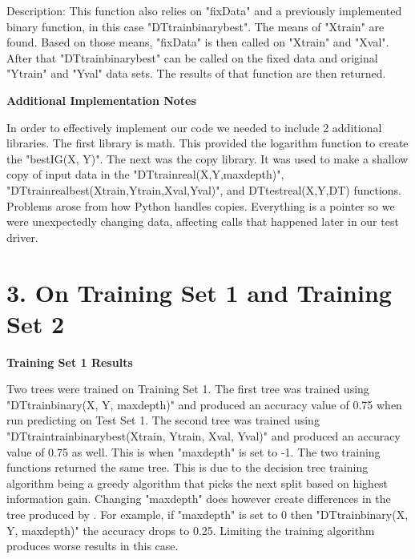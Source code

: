 \documentclass{article}
\begin{document}
\indent Description: This function also relies on "fixData" and a previously implemented binary function, in this case "DT\textunderscore train\textunderscore binary\textunderscore best". The means of "X\textunderscore train" are found. Based on those means, "fixData" is then called on "X\textunderscore train" and "X\textunderscore val". After that "DT\textunderscore train\textunderscore binary\textunderscore best" can be called on the fixed data and original "Y\textunderscore train" and "Y\textunderscore val" data sets. The results of that function are then returned.

\textbf{Additional Implementation Notes}

\indent In order to effectively implement our code we needed to include 2 additional libraries. The first library is math. This provided the logarithm function to create the "best\textunderscore IG(X, Y)". The next was the copy library. It was used to make a shallow copy of input data in the "DT\textunderscore train\textunderscore real(X,Y,max\textunderscore depth)", "DT\textunderscore train\textunderscore real\textunderscore best(X\textunderscore train,Y\textunderscore train,X\textunderscore val,Y\textunderscore val)", and DT\textunderscore test\textunderscore real(X,Y,DT) functions. Problems arose from how Python handles copies. Everything is a pointer so we were unexpectedly changing data, affecting calls that happened later in our test driver.  

\section*{3. On Training Set 1 and Training Set 2}

\noindent \textbf{Training Set 1 Results}

\indent Two trees were trained on Training Set 1. The first tree was trained using "DT\textunderscore train\textunderscore binary(X, Y, max\textunderscore depth)" and produced an accuracy value of 0.75 when run predicting on Test Set 1. The second tree was trained using "DT\textunderscore train\textunderscore train\textunderscore binary\textunderscore best(X\textunderscore train, Y\textunderscore train, X\textunderscore val, Y\textunderscore val)" and produced an accuracy value of 0.75 as well. This is when "max\textunderscore depth" is set to -1. The two training functions returned the same tree. This is due to the decision tree training algorithm being a greedy algorithm that picks the next split based on highest information gain. Changing "max\textunderscore depth" does however create differences in the tree produced by . For example, if "max\textunderscore depth" is set to 0 then "DT\textunderscore train\textunderscore binary(X, Y, max\textunderscore depth)" the accuracy drops to 0.25. Limiting the training algorithm produces worse results in this case.
\end{document}
